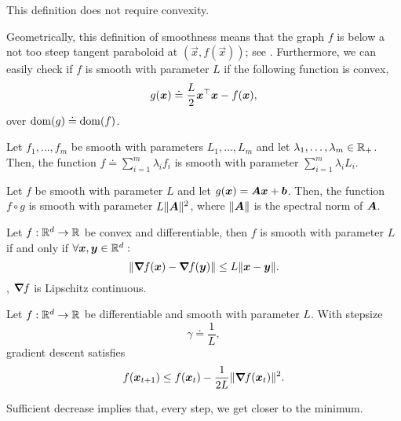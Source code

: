 \begin{remark}
    This definition does not require convexity.
\end{remark}

Geometrically, this definition of smoothness means that the graph $f$ is below a not too steep
tangent paraboloid at $(\vec{x},f(\vec{x}))$; see . Furthermore, we can easily
check if $f$ is smooth with parameter $L$ if the following function is convex, \[
    g(\bm{x}) \doteq \frac{L}{2} \bm{x}^\top\bm{x} - f(\bm{x}),
\]
over $\mathrm{dom}(g) \doteq \mathrm{dom}(f)$.

\begin{observation}
    Let $f_1,\ldots,f_m$ be smooth with parameters $L_1,\ldots,L_m$ and let
    $\lambda_1,\ldots,\lambda_m\in \mathbb{R}_+$. Then, the function $f \doteq \sum_{i=1}^{m} \lambda_i f_i$
    is smooth with parameter $\sum_{i=1}^{m} \lambda_i L_i$.

    Let $f$ be smooth with parameter $L$ and let $g(\bm{x}) = \bm{A}\bm{x} + \bm{b}$. Then, the
    function $f\circ g$ is smooth with parameter $L\|\bm{A}\|^2$, where $\|\bm{A}\|$ is the spectral
    norm of $\bm{A}$.
\end{observation}

\begin{lemma}
    Let $f: \mathbb{R}^d \to \mathbb{R}$ be convex and differentiable, then $f$ is smooth with parameter $L$ if and only if $\forall \bm{x},\bm{y}\in \mathbb{R}^d:$ \[
        \|\bm{\nabla}_{\! } f(\bm{x}) - \bm{\nabla}_{\! } f(\bm{y})\| \leq L\|\bm{x}-\bm{y}\|.
    \]
    \Ie, $\bm{\nabla}_{\! } f$ is Lipschitz continuous.
\end{lemma}

\begin{lemma}
    Let $f: \mathbb{R}^d \to \mathbb{R}$ be differentiable and smooth with parameter $L$. With stepsize \[
        \gamma \doteq \frac{1}{L},
    \]
    gradient descent satisfies \[
        f(\bm{x}_{t+1}) \leq f(\bm{x}_t) - \frac{1}{2L} \|\bm{\nabla}_{\! } f(\bm{x}_t)\|^2.
    \]
\end{lemma}

Sufficient decrease implies that, every step, we get closer to the minimum.

